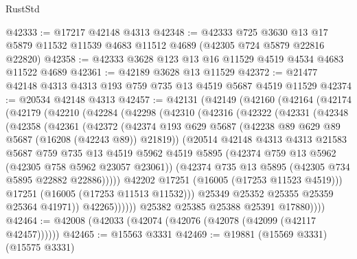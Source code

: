 \begin{lexlean}{RustStd}
\begin{coremodule}
@42333 := @17217 @42148 @4313
@42348 := @42333
    @725
    @3630
    @13
    @17
    @5879
    @11532
    @11539
    @4683
    @11512
    @4689
    (@42305 @724 @5879 @22816 @22820)
@42358 := @42333 @3628 @123 @13 @16 @11529 @4519 @4534 @4683 @11522 @4689
@42361 := @42189 @3628 @13 @11529
@42372 := @21477 @42148 @4313 @4313 @193 @759 @735 @13 @4519 @5687 @4519 @11529
@42374 := @20534 @42148 @4313
@42457 := @42131
    (@42149
      (@42160
        (@42164
          (@42174
            (@42179
              (@42210
                (@42284
                  (@42298
                    (@42310
                      (@42316
                        (@42322
                          (@42331
                            (@42348
                              (@42358
                                (@42361
                                  (@42372
                                    (@42374
                                      @193
                                      @629
                                      @5687
                                      (@42238 @89 @629 @89 @5687 (@16208 (@42243 @89)) @21819))
                                    (@20514
                                      @42148
                                      @4313
                                      @4313
                                      @21583
                                      @5687
                                      @759
                                      @735
                                      @13
                                      @4519
                                      @5962
                                      @4519
                                      @5895
                                      (@42374 @759 @13 @5962 (@42305 @758 @5962 @23057 @23061))
                                      (@42374 @735 @13 @5895 (@42305 @734 @5895 @22882 @22886)))))
                                @42202
                                @17251
                                (@16005 (@17253 @11523 @4519)))
                              @17251
                              (@16005 (@17253 @11513 @11532)))
                            @25349
                            @25352
                            @25355
                            @25359
                            @25364
                            @41971))
                        @42265))))))
            @25382
            @25385
            @25388
            @25391
            @17880))))
@42464 := @42008 (@42033 (@42074 (@42076 (@42078 (@42099 (@42117 @42457))))))
@42465 := @15563 @3331
@42469 := @19881 (@15569 @3331) (@15575 @3331)

\end{coremodule}
\end{lexlean}
